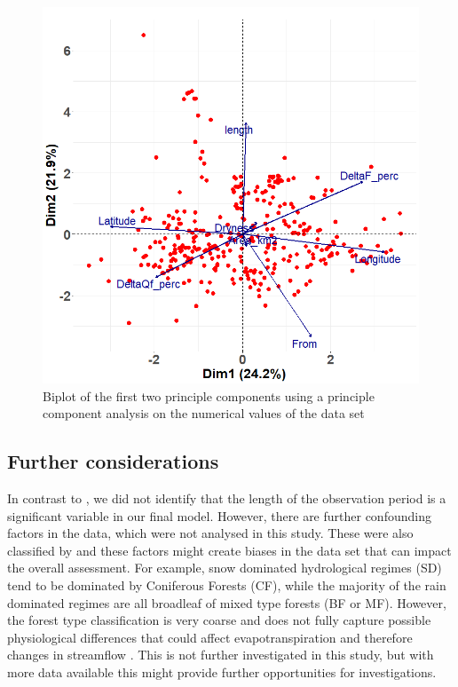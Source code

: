 \documentclass[]{elsarticle} %
\begin{document}
\begin{figure}
\includegraphics[width=0.9\linewidth]{PCA_biplot_Alldata} \caption{Biplot of the first two principle components using a principle component analysis on the numerical values of the data set}\label{fig:pcaplot}
\end{figure}

\hypertarget{further-considerations}{%
\subsection{Further considerations}\label{further-considerations}}

In contrast to \citet{filoso2017}, we did not identify that the length of the observation period is a significant variable in our final model. However, there are further confounding factors in the data, which were not analysed in this study. These were also classified by \citet{filoso2017} and these factors might create biases in the data set that can impact the overall assessment. For example, snow dominated hydrological regimes (SD) tend to be dominated by Coniferous Forests (CF), while the majority of the rain dominated regimes are all broadleaf of mixed type forests (BF or MF). However, the forest type classification is very coarse and does not fully capture possible physiological differences that could affect evapotranspiration and therefore changes in streamflow \citep{vervoort2021}. This is not further investigated in this study, but with more data available this might provide further opportunities for investigations.
\end{document}
